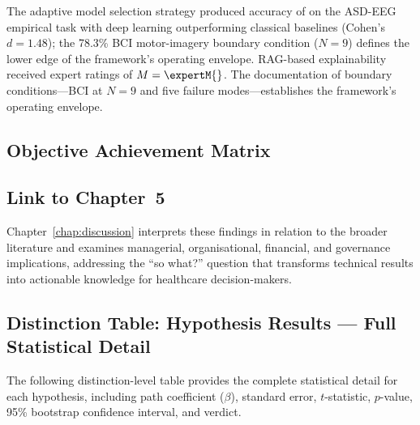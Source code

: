 The adaptive model selection strategy produced accuracy of \asdacc{} on the ASD-EEG empirical task with deep learning outperforming classical baselines (Cohen's $d=1.48$); the 78.3\% BCI motor-imagery boundary condition ($N=9$) defines the lower edge of the framework's operating envelope. RAG-based explainability received expert ratings of $M = \expertM{}$. The documentation of boundary conditions---BCI at $N = 9$ and five failure modes---establishes the framework's operating envelope.

\subsection{Objective Achievement Matrix}

\subsection{Link to Chapter~5}

Chapter~\ref{chap:discussion} interprets these findings in relation to the broader literature and examines managerial, organisational, financial, and governance implications, addressing the ``so what?'' question that transforms technical results into actionable knowledge for healthcare decision-makers.
\fi




\subsection{Distinction Table: Hypothesis Results --- Full Statistical Detail}
\label{sec:distinction_hypothesis_results}

\noindent The following distinction-level table provides the complete statistical detail for each hypothesis, including path coefficient ($\beta$), standard error, $t$-statistic, $p$-value, 95\% bootstrap confidence interval, and verdict.

